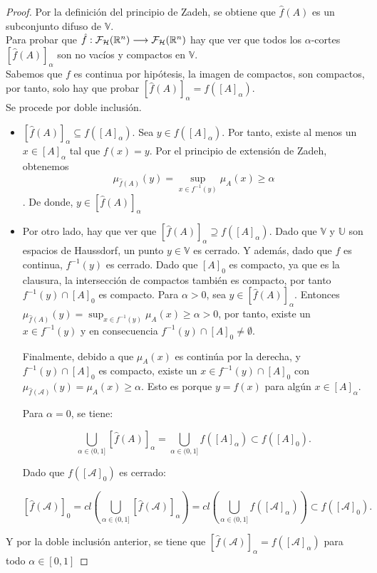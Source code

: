   \begin{proof}
    Por la definición del principio de Zadeh, se obtiene que $\hat{f}(A)$ es un subconjunto difuso de $\mathbb{V}$. \\
    Para probar que $\hat{f} : \mathcal{F}_\mathcal{H}(\mathbb R^n) \longrightarrow \mathcal{F}_\mathcal{H}(\mathbb R^n)$ hay que ver que todos los $\alpha$-cortes $[\hat{f}(A)]_\alpha$ son no vacíos y compactos en $\mathbb{V}$. \\
    Sabemos que $f$ es continua por hipótesis, la imagen de compactos, son compactos, por tanto, solo hay que probar $[\hat{f}(A)]_\alpha = f([A]_\alpha)$. \\
    Se procede por doble inclusión.
    
    \begin{itemize}
    \item $[\hat{f}(A)]_\alpha \subseteq f([A]_\alpha)$. Sea $y \in f([A]_\alpha)$. Por tanto, existe al menos un $x \in [A]_\alpha$ tal que $f(x)=y$. Por el principio de extensión de Zadeh, obtenemos $$\mu_{\hat{f}(A)}(y)=\sup_{x\in f^{-1}(y)} \mu_A(x) \geq \alpha$$. De donde, $y \in [\hat{f}(A)]_\alpha$
    \item Por otro lado, hay que ver que $[\hat{f}(A)]_\alpha \supseteq f([A]_\alpha)$. Dado que $\mathbb{V}$ y $\mathbb{U}$ son espacios de Haussdorf, un punto $y \in \mathbb{V}$ es cerrado. Y además, dado que $f$ es continua, $f^{-1}(y)$ es cerrado. Dado que $[A]_0$ es compacto, ya que es la clausura, la intersección de compactos también es compacto, por tanto $f^{-1}(y) \cap [A]_0$ es compacto. Para $\alpha>0$, sea $y \in [\hat{f}(A)]_\alpha$. Entonces $\mu_{\hat{f}(A)}(y)=\sup_{x\in f^{-1}(y)} \mu_A(x) \geq \alpha>0$, por tanto, existe un $x\in f^{-1}(y)$ y en consecuencia $f^{-1}(y) \cap [A]_0 \neq \emptyset$.
    
    Finalmente, debido a que $\mu_A(x)$ es continúa por la derecha, y $f^{-1}(y) \cap [A]_0$ es compacto, existe un $x \in f^{-1}(y) \cap [A]_0$ con $\mu_{\hat{f}(\mathcal{A})}(y)=\mu_{A}(x) \geq \alpha$. Esto es porque $y=f(x)$ para algún $x \in [A]_\alpha$.
    
    Para $\alpha=0$, se tiene:
    
    $$
    \bigcup_{\alpha \in (0, 1]} [\hat{f}(A)]_\alpha = \bigcup_{\alpha \in (0, 1]} f([A]_\alpha) \subset f([A]_0).
	$$
	
	Dado que $f([\mathcal{A}]_0)$ es cerrado:
	
	$$
	[\hat{f}(\mathcal{A})]_0 = cl\left( \bigcup_{\alpha \in (0, 1]} [\hat{f}(\mathcal{A})]_\alpha  \right) = cl\left(\bigcup_{\alpha \in (0, 1]} f([\mathcal{A}]_\alpha) \right)	\subset f([\mathcal{A}]_0).
	    $$
	     \end{itemize}
	    Y por la doble inclusión anterior, se tiene que $[\hat{f}(\mathcal{A})]_\alpha = f([\mathcal{A}]_\alpha)$ para todo $\alpha \in [0, 1]$
  \end{proof}


